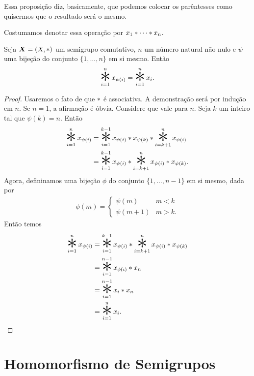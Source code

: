 	Essa proposição diz, basicamente, que podemos colocar os parêntesses como quisermos que o resultado será o mesmo.
\begin{nota}
	Costumamos denotar essa operação por $x_1  \ast  \cdots  \ast  x_n$.
\end{nota}

\begin{defi}
	Seja $\bm X=(X, \ast )$ um semigrupo comutativo, $n$ um número natural não nulo e $\psi$ uma bijeção do conjunto $\{1, \ldots,n\}$ em si mesmo. Então
	\begin{equation*}
	\bigopb _{i=1}^n x_{\psi(i)} = \bigopb _{i=1}^n x_i.
	\end{equation*}
\end{defi}
\begin{proof}
	Usaremos o fato de que $ \ast $ é associativa. A demonstração será por indução em $n$. Se $n=1$, a afirmação é óbvia. Considere que vale para $n$. Seja $k$ um inteiro tal que $\psi(k)=n$. Então
	\begin{equation*}
	\begin{split}
	\bigopb _{i=1}^n x_{\psi(i)} &= \bigopb _{i=1}^{k-1} x_{\psi(i)}  \opb  x_{\psi(k)}  \opb  \bigopb _{i=k+1}^n x_{\psi(i)} \\
		&= \bigopb _{i=1}^{k-1} x_{\psi(i)}  \opb  \bigopb _{i=k+1}^n x_{\psi(i)}  \opb  x_{\psi(k)}.
	\end{split}
	\end{equation*}
Agora, defininamos uma bijeção $\phi$ do conjunto $\{1, \ldots,n-1\}$ em si mesmo, dada por
	\begin{align*}
	\phi(m)=
	\begin{cases}
	\psi(m) 		& m<k \\
	\psi(m+1) & m>k.
	\end{cases}
	\end{align*}
	Então temos
	\begin{equation*}
	\begin{split}
	\bigopb _{i=1}^n x_{\psi(i)} &= \bigopb _{i=1}^{k-1} x_{\psi(i)}  \opb  \bigopb _{i=k+1}^n x_{\psi(i)}  \opb  x_{\psi(k)} \\
		&= \bigopb _{i=1}^{n-1} x_{\phi(i)}  \opb  x_n \\
		&= \bigopb _{i=1}^{n-1} x_i  \opb  x_n \\
		&= \bigopb _{i=1}^n x_i.
	\end{split}
	\end{equation*}
\end{proof}

\section{Homomorfismo de Semigrupos}

